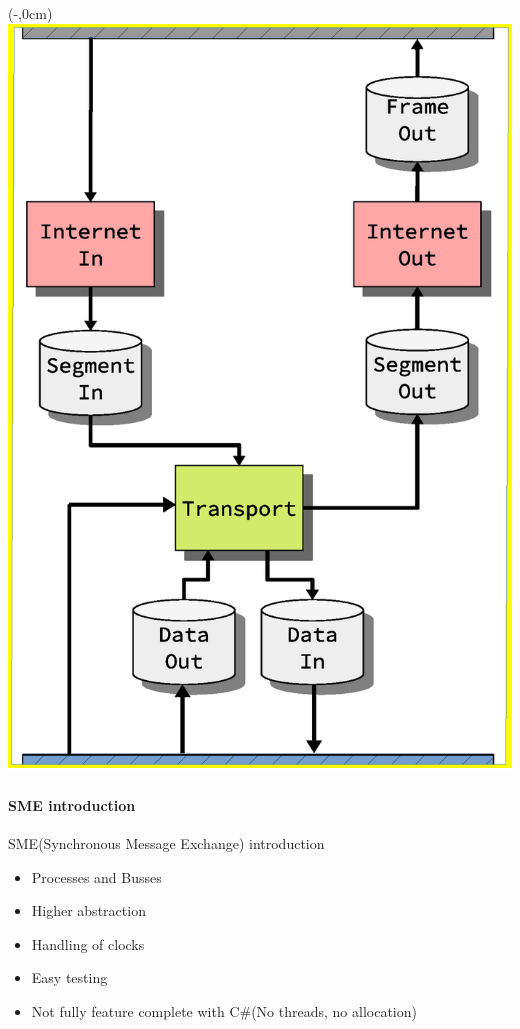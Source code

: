 \begin{frame}
    \begin{textblock*}{\displayThumbnail}(\paperwidth-\displayThumbnail-0.2cm,0cm) %
        \colorbox{white}{\includegraphics[width=\textwidth]{implementation/design_2_sme.eps}}
    \end{textblock*}
    \frametitle{\ImplementationTitle}
    \framesubtitle{SME introduction}
    SME(Synchronous Message Exchange) introduction
    \begin{itemize}
        \item Processes and Busses
        \item Higher abstraction
        \item Handling of clocks
        \item Easy testing
        \item Not fully feature complete with C\#(No threads, no allocation)
    \end{itemize}
\end{frame}
